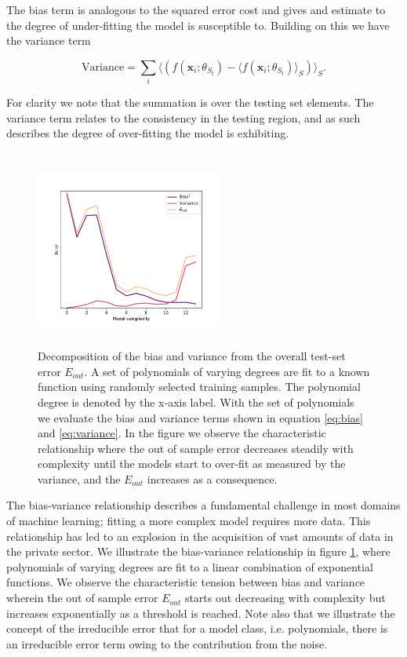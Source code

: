 \noindent The bias term is analogous to the squared error cost and gives and estimate to the degree of under-fitting the model is susceptible to. Building on this we have the variance term 

\begin{equation}\label{eq:variance}
\text{Variance} = \sum_i \langle (f(\mathbf{x}_i; \theta_{S_t}) - \langle f(\mathbf{x}_i; \theta_{S_t}) \rangle_S)\rangle_S.
\end{equation}

\noindent For clarity we note that the summation is over the testing set elements. The variance term relates to the consistency in the testing region, and as such describes the degree of over-fitting the model is exhibiting.

\begin{figure}
\centering
\includegraphics[width=0.55\textwidth, height=6.5cm]{../figures/bias_var_degree.pdf}
\caption[Bias-variance decomposition ]{Decomposition of the bias and variance from the overall test-set error $E_{out}$. A set of polynomials of varying degrees are fit to a known function using randomly selected training samples. The polynomial degree is denoted by the x-axis label. With the set of polynomials we evaluate the bias and variance terms shown in equation \ref{eq:bias} and \ref{eq:variance}. In the figure we observe the characteristic relationship where the out of sample error decreases steadily with complexity until the models start to over-fit as measured by the variance, and the $E_{out}$ increases as a consequence.}\label{fig:bv}
\end{figure}

The bias-variance relationship describes a fundamental challenge in most domains of machine learning; fitting a more complex model requires more data. This relationship has led to an explosion in the acquisition of vast amounts of data in the private sector. We illustrate the bias-variance relationship in figure \ref{fig:bv}, where polynomials of varying degrees are fit to a linear combination of exponential functions. We observe the characteristic tension between bias and variance wherein the out of sample error $E_{out}$ starts out decreasing with complexity but increases exponentially as a threshold is reached. Note also that we illustrate the concept of the irreducible error that for a model class, i.e. polynomials, there is an irreducible error term owing to the contribution from the noise. 

